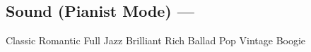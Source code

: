 \subsection[Sound (Pianist Mode)]{Sound (Pianist Mode) --- \UiKey{\I}\UiKey{\SND}}
Classic
Romantic
Full
Jazz
Brilliant
Rich
Ballad
Pop
Vintage
Boogie
